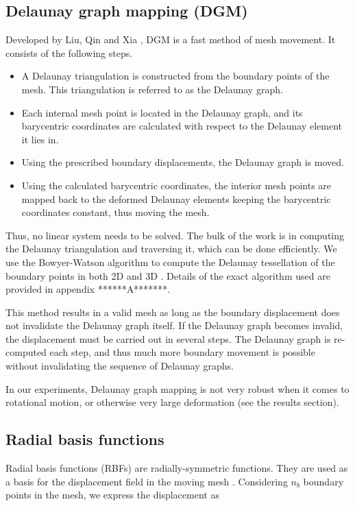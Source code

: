 \subsection{Delaunay graph mapping (DGM)}
 \label{sec:dgm}
 Developed by Liu, Qin and Xia \cite{mm:dgm}, DGM is a fast method of mesh movement. It consists of the following steps.
 \begin{itemize}
 	\item A Delaunay triangulation is constructed from the boundary points of the mesh. This triangulation is referred to as the Delaunay graph.
 	\item Each internal mesh point is located in the Delaunay graph, and its barycentric coordinates are calculated with respect to the Delaunay element it lies in.
 	\item Using the prescribed boundary displacements, the Delaunay graph is moved.
 	\item Using the calculated barycentric coordinates, the interior mesh points are mapped back to the deformed Delaunay elements keeping the barycentric coordinates constant, thus moving the mesh.
 \end{itemize}
 Thus, no linear system needs to be solved. The bulk of the work is in computing the Delaunay triangulation and traversing it, which can be done efficiently. We use the Bowyer-Watson algorithm to compute the Delaunay tessellation of the boundary points in both 2D and 3D \cite{bowyer}. Details of the exact algorithm used are provided in appendix ******A*******.
 
 This method results in a valid mesh as long as the boundary displacement does not invalidate the Delaunay graph itself. If the Delaunay graph becomes invalid, the displacement must be carried out in several steps. The Delaunay graph is re-computed each step, and thus much more boundary movement is possible without invalidating the sequence of Delaunay graphs.
 
 In our experiments, Delaunay graph mapping is not very robust when it comes to rotational motion, or otherwise very large deformation (see the results section).
 
 \subsection{Radial basis functions}
 
 Radial basis functions (RBFs) are radially-symmetric functions. They are used as a basis for the displacement field in the moving mesh \cite{mm:rbf}. Considering $n_b$ boundary points in the mesh, we express the displacement as
 
